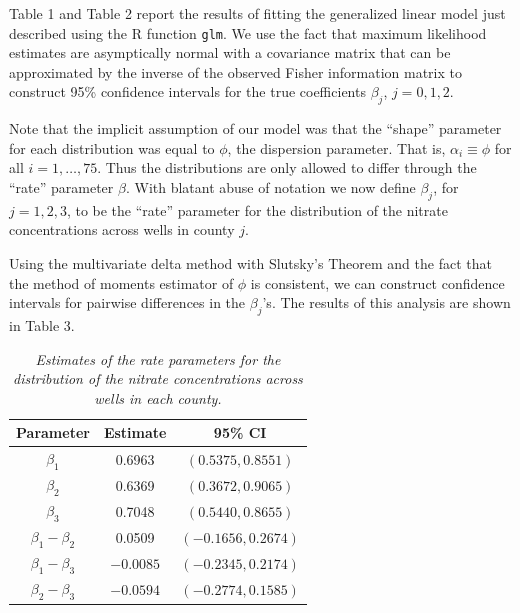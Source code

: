\documentclass[12pt]{article}
\begin{document}
\begin{enumerate}
    Table 1 and Table 2 report the results of fitting the generalized linear model just described using the R function \texttt{glm}.
    We use the fact that maximum likelihood estimates are asymptically normal with a covariance matrix that can be approximated by the inverse of
    the observed Fisher information matrix to construct 95\% confidence intervals for the true coefficients $\beta_{j}$, $j = 0, 1, 2$.

    Note that the implicit assumption of our model was that the ``shape'' parameter for each distribution was equal to $\phi$, the dispersion
    parameter. That is, $\alpha_i \equiv \phi$ for all $i = 1, \dots, 75$. Thus the distributions are only allowed to differ through the ``rate''
    parameter $\beta$. With blatant abuse of notation we now define $\beta_j$, for $j = 1, 2, 3$, to be the ``rate'' parameter for the distribution of
    the nitrate concentrations across wells in county $j$. 
    
    Using the multivariate delta method with Slutsky's Theorem and the fact that the method of
    moments estimator of $\phi$ is consistent, we can construct confidence intervals for pairwise differences in the $\beta_{j}$'s.
    The results of this analysis are shown in Table 3.

    \begin{table}[h]
      \caption{\emph{Estimates of the rate parameters for the distribution of the nitrate concentrations across wells in each county.}}
      \vspace{.5cm}
      \centering
      \begin{tabular}{|c|c|c|}
        \hline
        Parameter & Estimate & 95\% CI \\
        \hline
        $\beta_1$ & 0.6963 & $(0.5375,0.8551)$ \\
        \hline
        $\beta_2$ & 0.6369 & $(0.3672, 0.9065)$ \\
        \hline
        $\beta_3$ & 0.7048 & $(0.5440, 0.8655)$ \\
        \hline
        $\beta_1 - \beta_2$ & 0.0509 & $(-0.1656, 0.2674)$ \\
        \hline
        $\beta_1 - \beta_3$ & $-0.0085$ & $(-0.2345, 0.2174)$ \\
        \hline
        $\beta_2 - \beta_3$ & $-0.0594$ & $(-0.2774, 0.1585)$ \\
        \hline
      \end{tabular}
      \label{tab:3}
    \end{table}


\end{enumerate}
\end{document}
